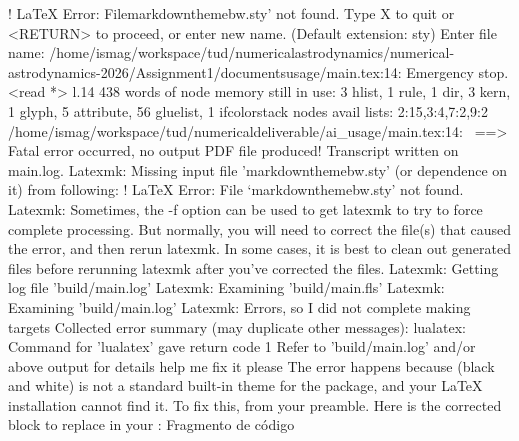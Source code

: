 {{! LaTeX Error: File}markdownthemebw.sty' not found. Type X to quit or <RETURN> to proceed, or enter new name. (Default extension: sty) Enter file name: /home/ismag/workspace/tud/numerical}astrodynamics/numerical-astrodynamics-2026/Assignment1/documentsusage/main.tex:14: Emergency stop. <read *> l.14 438 words of node memory still in use: 3 hlist, 1 rule, 1 dir, 3 kern, 1 glyph, 5 attribute, 56 gluelist, 1 ifcolorstack nodes avail lists: 2:15,3:4,7:2,9:2 /home/ismag/workspace/tud/numericaldeliverable/ai_usage/main.tex:14:  ==> Fatal error occurred, no output PDF file produced! Transcript written on main.log. Latexmk: Missing input file 'markdownthemebw.sty' (or dependence on it) from following: ! LaTeX Error: File `markdownthemebw.sty' not found. Latexmk: Sometimes, the -f option can be used to get latexmk to try to force complete processing. But normally, you will need to correct the file(s) that caused the error, and then rerun latexmk. In some cases, it is best to clean out generated files before rerunning latexmk after you've corrected the files. Latexmk: Getting log file 'build/main.log' Latexmk: Examining 'build/main.fls' Latexmk: Examining 'build/main.log' Latexmk: Errors, so I did not complete making targets Collected error summary (may duplicate other messages): lualatex: Command for 'lualatex' gave return code 1 Refer to 'build/main.log' and/or above output for details help me fix it please\markdownRendererInterblockSeparator
{}
\markdownRendererSectionEnd \markdownRendererSectionBegin
{}\markdownRendererInterblockSeparator
{}The error  happens because  (black and white) is not a standard built-in theme for the  package, and your LaTeX installation cannot find it.\markdownRendererInterblockSeparator
{}To fix this,  from your preamble.\markdownRendererInterblockSeparator
{}Here is the corrected  block to replace in your :\markdownRendererInterblockSeparator
{}Fragmento de código\markdownRendererInterblockSeparator
{}\markdownRendererInterblockSeparator
